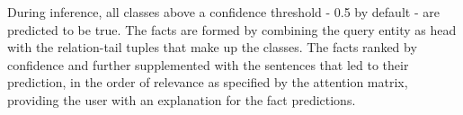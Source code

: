 During inference, all classes above a confidence threshold - 0.5 by default - are predicted to be true. The facts are formed by combining the query entity as head with the relation-tail tuples that make up the classes. The facts ranked by confidence and further supplemented with the sentences that led to their prediction, in the order of relevance as specified by the attention matrix, providing the user with an explanation for the fact predictions.
